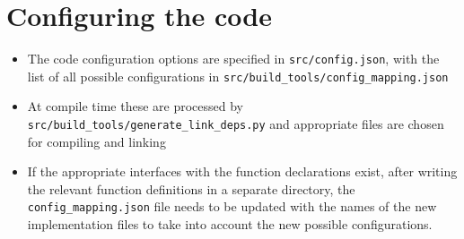 \documentclass[11pt]{article}
\begin{document}

\section{Configuring the code}
\begin{itemize}
  \item The code configuration options are specified in \texttt{src/config.json}, with the list of all possible configurations in \texttt{src/build\_tools/config\_mapping.json}
  \item At compile time these are processed by \texttt{src/build\_tools/generate\_link\_deps.py} and appropriate files are chosen for compiling and linking
  \item If the appropriate interfaces with the function declarations exist, after writing the relevant function definitions in a separate directory, the \texttt{config\_mapping.json} file needs to be updated with the names of the new implementation files to take into account the new possible configurations.
\end{itemize}
\end{document}
